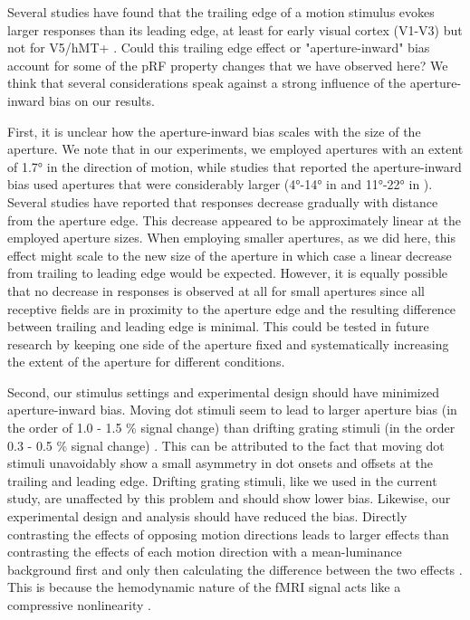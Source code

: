 Several studies have found that the trailing edge of a motion stimulus evokes larger responses than its leading edge, at least for early visual cortex (V1-V3) \parencite{Whitney2003, Liu2006, Wang2014, Schellekens2016} but not for V5/hMT+ \parencite{Wang2014}. Could this trailing edge effect or "aperture-inward" bias account for some of the pRF property changes that we have observed here? We think that several considerations speak against a strong influence of the aperture-inward bias on our results.

First, it is unclear how the aperture-inward bias scales with the size of the aperture. We note that in our experiments, we employed apertures with an extent of 1.7° in the direction of motion, while studies that reported the aperture-inward bias used apertures that were considerably larger (4°-14° in \cite{Schellekens2016} and 11°-22° in \cite{Wang2014}). Several studies \parencite{Wang2014, Schellekens2015, Schellekens2016} have reported that responses decrease gradually with distance from the aperture edge. This decrease appeared to be approximately linear \parencite{Schellekens2015} at the employed aperture sizes. When employing smaller apertures, as we did here, this effect might scale to the new size of the aperture in which case a linear decrease from trailing to leading edge would be expected. However, it is equally possible that no decrease in responses is observed at all for small apertures since all receptive fields are in proximity to the aperture edge and the resulting difference between trailing and leading edge is minimal. This could be tested in future research by keeping one side of the aperture fixed and systematically increasing the extent of the aperture for different conditions.

Second, our stimulus settings and experimental design should have minimized aperture-inward bias. Moving dot stimuli seem to lead to larger aperture bias (in the order of 1.0 - 1.5 \% signal change) \parencite{Wang2014, Schellekens2016} than drifting grating stimuli (in the order 0.3 - 0.5 \% signal change) \parencite{Whitney2003, Liu2006}. This can be attributed to the fact that moving dot stimuli unavoidably show a small asymmetry in dot onsets and offsets at the trailing and leading edge. Drifting grating stimuli, like we used in the current study, are unaffected by this problem and should show lower bias. Likewise, our experimental design and analysis should have reduced the bias. Directly contrasting the effects of opposing motion directions leads to larger effects than contrasting the effects of each motion direction with a mean-luminance background first and only then calculating the difference between the two effects \parencite{Liu2006}. This is because the hemodynamic nature of the fMRI signal acts like a compressive nonlinearity \parencite{Liu2006}. 

